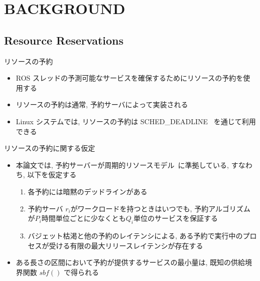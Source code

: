 
\section{BACKGROUND}
\label{sec: background}


\subsection{Resource Reservations}
\label{ssec: resource reservations}

\begin{frame}{リソースの予約}
    \begin{itemize}
        \item ROS スレッドの予測可能なサービスを確保するためにリソースの予約を使用する
        \item リソースの予約は通常, 予約サーバによって実装される
        \item Linux システムでは, リソースの予約は SCHED\_DEADLINE~\cite{lelli2016deadline} を通じて利用できる
    \end{itemize}
\end{frame}

\begin{frame}{リソースの予約に関する仮定}
    \begin{itemize}
        \item 本論文では, 予約サーバーが周期的リソースモデル~\cite{shin2003periodic}に準拠している, すなわち, 以下を仮定する
              \begin{enumerate}
                  \item 各予約には暗黙のデッドラインがある
                  \item 予約サーバ $r_i$がワークロードを持つときはいつでも, 予約アルゴリズムが$P_i$時間単位ごとに少なくとも$Q_i$単位のサービスを保証する
                  \item バジェット枯渇と他の予約のレイテンシによる, ある予約で実行中のプロセスが受ける有限の最大リリースレイテンシが存在する
              \end{enumerate}
        \item ある長さの区間において予約が提供するサービスの最小量は, 既知の供給境界関数 $sbf()$ \cite{shin2003periodic, lipari2003resource} で得られる
    \end{itemize}
\end{frame}


